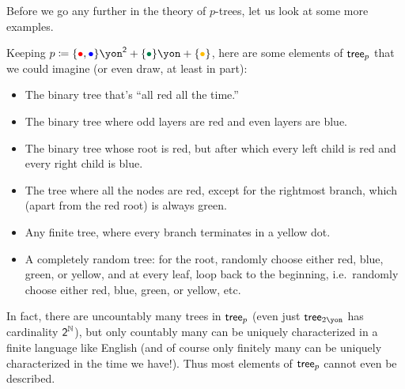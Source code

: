 \documentclass[Book-Poly]{subfiles}
\begin{document}
Before we go any further in the theory of $p$-trees, let us look at some more examples.

\begin{example} \label{ex.imagining_trees}
Keeping $p\coloneqq\{\bul[red],\bul[blue]\}\yon^\2+\{\bul[dgreen]\}\yon+\{\bul[dyellow]\}$, here are some elements of $\mathsf{tree}_p$ that we could imagine (or even draw, at least in part):
\begin{itemize}
	\item The binary tree that's ``all red all the time.''
	\item The binary tree where odd layers are red and even layers are blue.
	\item The binary tree whose root is red, but after which every left child is red and every right child is blue.%
	\item The tree where all the nodes are red, except for the rightmost branch, which (apart from the red root) is always green.
	\item Any finite tree, where every branch terminates in a yellow dot.
	\item A completely random tree: for the root, randomly choose either red, blue, green, or yellow, and at every leaf, loop back to the beginning, i.e.\ randomly choose either red, blue, green, or yellow, etc.
\end{itemize}
In fact, there are uncountably many trees in $\mathsf{tree}_p$ (even just $\tr_{2\yon}$ has cardinality $\textsf{2}^{\mathbb{N}}$), but only countably many can be uniquely characterized in a finite language like English (and of course only finitely many can be uniquely characterized in the time we have!).
Thus most elements of $\mathsf{tree}_p$ cannot even be described.
\end{example}
\end{document}
